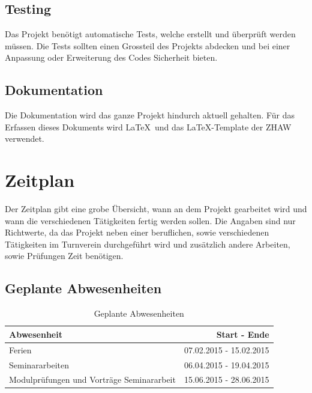 \subsection{Testing}\label{testing}
Das Projekt benötigt automatische Tests, welche erstellt und überprüft werden müssen. Die Tests sollten einen Grossteil des Projekts abdecken und bei einer Anpassung oder Erweiterung des Codes Sicherheit bieten.

\subsection{Dokumentation}\label{dokumentation}
Die Dokumentation wird das ganze Projekt hindurch aktuell gehalten. Für das Erfassen dieses Dokuments wird \LaTeX\ und das \LaTeX-Template der ZHAW verwendet.

\section{Zeitplan}\label{zeitplan}
Der Zeitplan gibt eine grobe Übersicht, wann an dem Projekt gearbeitet wird und wann die verschiedenen Tätigkeiten fertig werden sollen. Die Angaben sind nur Richtwerte, da das Projekt neben einer beruflichen, sowie verschiedenen Tätigkeiten im Turnverein durchgeführt wird und zusätzlich andere Arbeiten, sowie Prüfungen Zeit benötigen.

\subsection{Geplante Abwesenheiten}
\begin{table}[ht]
\centering
  \begin{tabular}{ l | r }
	\hline
	\rowcolor{gray}
	\textbf{Abwesenheit}					&	\textbf{Start - Ende}	\\ \hline
	Ferien								&	07.02.2015 - 15.02.2015	\\ \hline
	Seminararbeiten						&	06.04.2015 - 19.04.2015	\\ \hline
	Modulprüfungen und Vorträge Seminararbeit		&	15.06.2015 - 28.06.2015	\\ \hline
  \end{tabular}
   \caption{Geplante Abwesenheiten}\label{table:holidays}
\end{table}

